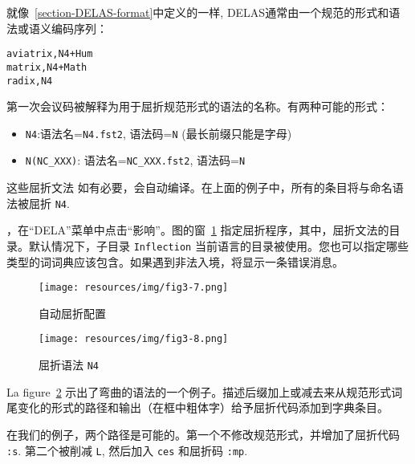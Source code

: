 就像~\ref{section-DELAS-format}中定义的一样, DELAS通常由一个规范的形式和语法或语义编码序列：


\begin{verbatim}
aviatrix,N4+Hum
matrix,N4+Math
radix,N4
\end{verbatim}

\bigskip
\noindent 第一次会议码被解释为用于屈折规范形式的语法的名称。有两种可能的形式：

\begin{itemize}
\item \verb+N4+:语法名=\verb+N4.fst2+, 语法码=\verb+N+
	(最长前缀只能是字母)
  \item \verb+N(NC_XXX)+: 语法名=\verb+NC_XXX.fst2+, 语法码=\verb+N+
\end{itemize}

\bigskip
\noindent 这些屈折文法
如有必要，会自动编译。在上面的例子中，所有的条目将与命名语法被屈折
\verb+N4+.

\bigskip
{}，在“DELA”菜单中点击“影响”。图的窗~\ref{fig-inflection-configuration} 指定屈折程序，其中，屈折文法的目录。默认情况下，子目录
\verb+Inflection+ 当前语言的目录被使用。您也可以指定哪些类型的词词典应该包含。如果遇到非法入境，将显示一条错误消息。

\bigskip
\begin{figure}[h]
\begin{center}
\texttt{[image: resources/img/fig3-7.png]}
\caption{自动屈折配置\label{fig-inflection-configuration}}
\end{center}
\end{figure}

\bigskip
\begin{figure}[h]
\begin{center}
\texttt{[image: resources/img/fig3-8.png]}
\caption{屈折语法
\texttt{N4}\label{fig-example-inflectional-grammar}}
\end{center}
\end{figure}

\bigskip
\noindent La figure~\ref{fig-example-inflectional-grammar} 示出了弯曲的语法的一个例子。描述后缀加上或减去来从规范形式词尾变化的形式的路径和输出（在框中粗体字）给予屈折代码添加到字典条目。

\bigskip
\noindent 在我们的例子，两个路径是可能的。第一个不修改规范形式，并增加了屈折代码 \verb+:s+. 第二个被削减
\verb+L+, 然后加入 \verb+ces+ 和屈折码 \verb+:mp+.


